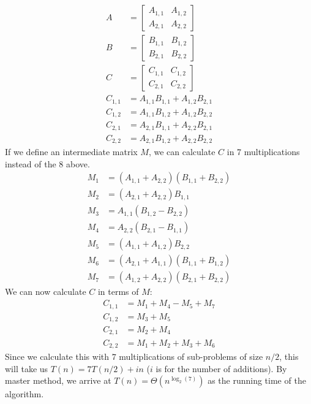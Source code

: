         \begin{align*}
            A &= \begin{bmatrix} A_{1,1} & A_{1,2} \\ A_{2,1} & A_{2,2} \end{bmatrix} \\
            B &= \begin{bmatrix} B_{1,1} & B_{1,2} \\ B_{2,1} & B_{2,2} \end{bmatrix} \\
            C &= \begin{bmatrix} C_{1,1} & C_{1,2} \\ C_{2,1} & C_{2,2} \end{bmatrix} \\
            C_{1,1} &= A_{1,1}B_{1,1} + A_{1,2}B_{2,1} \\
            C_{1,2} &= A_{1,1}B_{1,2} + A_{1,2}B_{2,2} \\
            C_{2,1} &= A_{2,1}B_{1,1} + A_{2,2}B_{2,1} \\
            C_{2,2} &= A_{2,1}B_{1,2} + A_{2,2}B_{2,2}
        \end{align*}
        If we define an intermediate matrix $M$, we can calculate $C$ in 7
        multiplications instead of the 8 above.
        \begin{align*}
            M_1 &= (A_{1,1} + A_{2,2})(B_{1,1} + B_{2,2}) \\
            M_2 &= (A_{2,1} + A_{2,2})B_{1,1} \\
            M_3 &= A_{1,1}(B_{1,2} - B_{2,2}) \\
            M_4 &= A_{2,2}(B_{2,1} - B_{1,1}) \\
            M_5 &= (A_{1,1} + A_{1,2})B_{2,2} \\
            M_6 &= (A_{2,1} + A_{1,1})(B_{1,1} + B_{1,2}) \\
            M_7 &= (A_{1,2} + A_{2,2})(B_{2,1} + B_{2,2})
        \end{align*}
        We can now calculate $C$ in terms of $M$:
        \begin{align*}
            C_{1,1} &= M_1 + M_4 - M_5 + M_7 \\
            C_{1,2} &= M_3 + M_5 \\
            C_{2,1} &= M_2 + M_4 \\
            C_{2,2} &= M_1 + M_2 + M_3 + M_6
        \end{align*}
        Since we calculate this with $7$ multiplications of sub-problems of
        size $n/2$, this will take us $T(n) = 7 T(n/2) + in$ ($i$ is for the
        number of additions). By master method, we arrive at
        $T(n) = \Theta(n^{\log_2(7)})$ as the running time of the algorithm.

